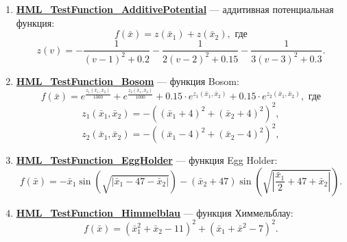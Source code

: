 \begin{enumerate}
\begin{equation}
\begin{aligned}
 \end{aligned}\right.
 \end{equation}
 \item \hyperref[TestFunctions:section:HML_TestFunction_AdditivePotential]{\textbf{HML\_TestFunction\_AdditivePotential}} --- аддитивная потенциальная функция:
 \begin{equation}
 f\left( \bar{x}\right) = z\left( \bar{x}_1\right)+ z\left( \bar{x}_2\right), \text{ где}
 \end{equation}
 \begin{equation*}
 z\left( v\right)= -\dfrac{1}{\left( v-1\right)^2+0.2 }-\dfrac{1}{2\left( v-2\right)^2+0.15}-\dfrac{1}{3\left( v-3\right)^2+0.3}.
 \end{equation*}
\item \hyperref[TestFunctions:section:HML_TestFunction_Bosom]{\textbf{HML\_TestFunction\_Bosom}} --- функция Bosom:
\begin{equation}
f\left( \bar{x}\right) = e^{\frac{z_1\left( \bar{x}_1,\bar{x}_2\right)}{1000} } +e^{\frac{z_2\left( \bar{x}_1,\bar{x}_2\right)}{1000} }+ 0.15\cdot e^{z_1\left( \bar{x}_1,\bar{x}_2\right) }+0.15\cdot e^{z_2\left( \bar{x}_1,\bar{x}_2\right) }, \text{ где}
\end{equation}
\begin{equation*}
\label{TestFunctions:eq:HML_Bosom2}
z_1\left( \bar{x}_1,\bar{x}_2\right) = -\left(\left( \bar{x}_1+4\right)^2 +\left( \bar{x}_2+4\right)^2 \right)^2 ,
\end{equation*}
\begin{equation*}
\label{TestFunctions:eq:HML_Bosom3}
z_2\left( \bar{x}_1,\bar{x}_2\right) = -\left(\left( \bar{x}_1-4\right)^2 +\left( \bar{x}_2-4\right)^2 \right)^2 ,
\end{equation*}
 \item \hyperref[TestFunctions:section:HML_TestFunction_EggHolder]{\textbf{HML\_TestFunction\_EggHolder}} --- функция Egg Holder:
 \begin{equation}
 f\left( \bar{x}\right) = -\bar{x}_1\sin\left( \sqrt{\left| \bar{x}_1-47-\bar{x}_2\right| }\right)- (\bar{x}_2+47)\sin\left( \sqrt{\left| \dfrac{\bar{x}_1}{2}+47+\bar{x}_2\right| }\right).
 \end{equation}
 \item \hyperref[TestFunctions:section:HML_TestFunction_Himmelblau]{\textbf{HML\_TestFunction\_Himmelblau}} --- функция Химмельблау:
 \begin{equation}
 f\left( \bar{x}\right) = \left( \bar{x}_1^2+\bar{x}_2-11\right)^2+\left( \bar{x}_1+\bar{x}^2-7\right)^2.

\end{equation}
\end{enumerate}
